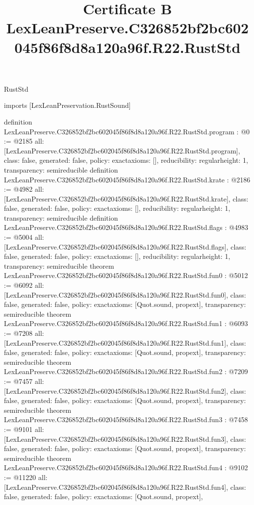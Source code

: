 \begin{lexlean}{RustStd}
\title{Certificate B LexLeanPreserve.C326852bf2bc602045f86f8d8a120a96f.R22.RustStd}
\begin{coremodule}
imports [LexLeanPreservation.RustSound]

definition LexLeanPreserve.C326852bf2bc602045f86f8d8a120a96f.R22.RustStd.program : @0 := @2185 {
  all: [LexLeanPreserve.C326852bf2bc602045f86f8d8a120a96f.R22.RustStd.program],
  class: false,
  generated: false,
  policy: exact{axioms: []},
  reducibility: regular{height: 1},
  transparency: semireducible
}
definition LexLeanPreserve.C326852bf2bc602045f86f8d8a120a96f.R22.RustStd.krate : @2186 := @4982 {
  all: [LexLeanPreserve.C326852bf2bc602045f86f8d8a120a96f.R22.RustStd.krate],
  class: false,
  generated: false,
  policy: exact{axioms: []},
  reducibility: regular{height: 1},
  transparency: semireducible
}
definition LexLeanPreserve.C326852bf2bc602045f86f8d8a120a96f.R22.RustStd.flags : @4983 := @5004 {
  all: [LexLeanPreserve.C326852bf2bc602045f86f8d8a120a96f.R22.RustStd.flags],
  class: false,
  generated: false,
  policy: exact{axioms: []},
  reducibility: regular{height: 1},
  transparency: semireducible
}
theorem LexLeanPreserve.C326852bf2bc602045f86f8d8a120a96f.R22.RustStd.fun0 : @5012 := @6092 {
  all: [LexLeanPreserve.C326852bf2bc602045f86f8d8a120a96f.R22.RustStd.fun0],
  class: false,
  generated: false,
  policy: exact{axioms: [Quot.sound, propext]},
  transparency: semireducible
}
theorem LexLeanPreserve.C326852bf2bc602045f86f8d8a120a96f.R22.RustStd.fun1 : @6093 := @7208 {
  all: [LexLeanPreserve.C326852bf2bc602045f86f8d8a120a96f.R22.RustStd.fun1],
  class: false,
  generated: false,
  policy: exact{axioms: [Quot.sound, propext]},
  transparency: semireducible
}
theorem LexLeanPreserve.C326852bf2bc602045f86f8d8a120a96f.R22.RustStd.fun2 : @7209 := @7457 {
  all: [LexLeanPreserve.C326852bf2bc602045f86f8d8a120a96f.R22.RustStd.fun2],
  class: false,
  generated: false,
  policy: exact{axioms: [Quot.sound, propext]},
  transparency: semireducible
}
theorem LexLeanPreserve.C326852bf2bc602045f86f8d8a120a96f.R22.RustStd.fun3 : @7458 := @9101 {
  all: [LexLeanPreserve.C326852bf2bc602045f86f8d8a120a96f.R22.RustStd.fun3],
  class: false,
  generated: false,
  policy: exact{axioms: [Quot.sound, propext]},
  transparency: semireducible
}
theorem LexLeanPreserve.C326852bf2bc602045f86f8d8a120a96f.R22.RustStd.fun4 : @9102 := @11220 {
  all: [LexLeanPreserve.C326852bf2bc602045f86f8d8a120a96f.R22.RustStd.fun4],
  class: false,
  generated: false,
  policy: exact{axioms: [Quot.sound, propext]},
}
\end{coremodule}
\end{lexlean}
